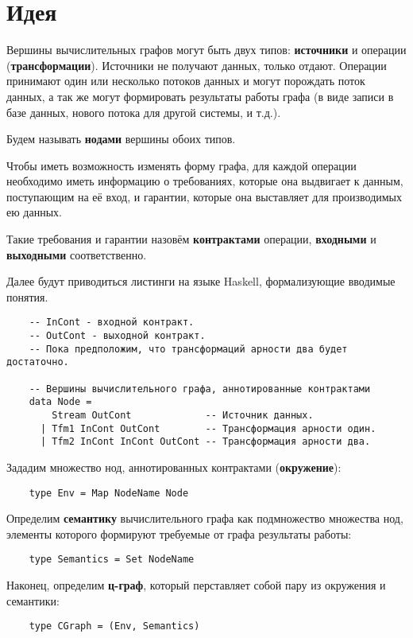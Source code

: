 \section{Идея}

Вершины вычислительных графов могут быть двух типов: \textbf{источники} и операции (\textbf{трансформации}). Источники не получают данных, только отдают. Операции принимают один или несколько потоков данных и могут порождать поток данных, а так же могут формировать результаты работы графа (в виде записи в базе данных, нового потока для другой системы, и т.д.).

Будем называть \textbf{нодами} вершины обоих типов.

Чтобы иметь возможность изменять форму графа, для каждой операции необходимо иметь информацию о требованиях, которые она выдвигает к данным, поступающим на её вход, и гарантии, которые она выставляет для производимых ею данных.

Такие требования и гарантии назовём \textbf{контрактами} операции, \textbf{входными} и \textbf{выходными} соответственно.

Далее будут приводиться листинги на языке Haskell, формализующие вводимые понятия.

\begin{lstlisting}
    -- InCont - входной контракт.
    -- OutCont - выходной контракт.
    -- Пока предположим, что трансформаций арности два будет достаточно.

    -- Вершины вычислительного графа, аннотированные контрактами
    data Node =
        Stream OutCont             -- Источник данных.
      | Tfm1 InCont OutCont        -- Трансформация арности один.
      | Tfm2 InCont InCont OutCont -- Трансформация арности два.
\end{lstlisting}

Зададим множество нод, аннотированных контрактами (\textbf{окружение}):
\begin{lstlisting}
    type Env = Map NodeName Node
\end{lstlisting}

Определим \textbf{семантику} вычислительного графа как подмножество множества нод, элементы которого формируют требуемые от графа результаты работы:
\begin{lstlisting}
    type Semantics = Set NodeName
\end{lstlisting}

Наконец, определим \textbf{ц-граф}, который перставляет собой пару из окружения и семантики:
\begin{lstlisting}
    type CGraph = (Env, Semantics)
\end{lstlisting}

